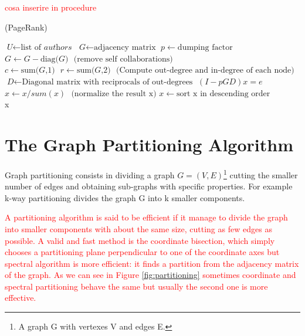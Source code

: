 \documentclass[]{usiinfbachelorproject}
\begin{document}
\textcolor{red}{cosa inserire in procedure}
\begin{algorithm}
\caption{ (PageRank)}\label{pagerank}
\begin{algorithmic}[1]
\State $\textit{U} \gets \text{list of }\textit{authors}$
\State $\textit{G} \gets \text{adjacency matrix}$
\State $p \gets \text{dumping factor}$
\State $\textit{G} \gets \textit{G} - \text{diag(}\textit{G}\text{)} \: \: \: \text{(remove self collaborations)}$
\State $\textit{c} \gets \text{sum(}\textit{G}\text{,1)} \:\:\: \textit{r} \gets \text{sum(}\textit{G}\text{,2)} \:\:\: \text{(Compute out-degree and in-degree of each node)}$
\State $\textit{D} \gets \text{Diagonal matrix with reciprocals of out-degrees}$
\State $(I - pGD)x = e$
\State $x \gets x / sum(x) \: \:\: \text{(normalize the result x)}$
\State $x \gets \text{sort x in descending order}$\\
\Return x
\EndProcedure
\end{algorithmic}
\end{algorithm}






\section{The Graph Partitioning Algorithm} \label{sec:graphpart} 
Graph partitioning consists in dividing a graph $G=(V,E)$\footnote{A graph G with vertexes V and edges E.}  cutting the smaller number of edges and obtaining sub-graphs with specific properties. For example k-way partitioning divides the graph G into k smaller components.

\textcolor{red}{A partitioning algorithm is said to be efficient if it manage to divide the graph into smaller components with about the same size, cutting as few edges as possible. 
A valid and fast method is the coordinate bisection, which simply chooses a partitioning plane perpendicular to one of the coordinate axes but spectral algorithm is more efficient: it finds a partition from the adjacency matrix of the graph. As we can see in Figure \ref{fig:partitioning} sometimes coordinate and spectral partitioning behave the same but usually the second one is more effective.}
\end{document}
